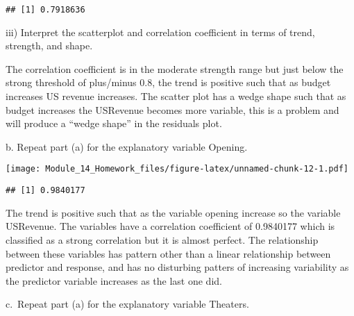 \documentclass[
]{article}
\newenvironment{Shaded}{\begin{snugshade}}{\end{snugshade}}
\newcommand{\AttributeTok}[1]{\textcolor[rgb]{0.13,0.29,0.53}{#1}}
\newcommand{\FunctionTok}[1]{\textcolor[rgb]{0.13,0.29,0.53}{\textbf{#1}}}
\newcommand{\NormalTok}[1]{#1}
\newcommand{\SpecialCharTok}[1]{\textcolor[rgb]{0.81,0.36,0.00}{\textbf{#1}}}
\begin{document}
\begin{verbatim}
## [1] 0.7918636
\end{verbatim}

\hfill\break
iii) Interpret the scatterplot and correlation coefficient in terms of
trend, strength, and shape.

The correlation coefficient is in the moderate strength range but just
below the strong threshold of plus/minus 0.8, the trend is positive such
that as budget increases US revenue increases. The scatter plot has a
wedge shape such that as budget increases the USRevenue becomes more
variable, this is a problem and will produce a ``wedge shape'' in the
residuals plot.

\hfill\break
b. Repeat part (a) for the explanatory variable Opening.

\begin{Shaded}
\end{Shaded}

\texttt{[image: Module\_14\_Homework\_files/figure-latex/unnamed-chunk-12-1.pdf]}

\begin{Shaded}
\end{Shaded}

\begin{verbatim}
## [1] 0.9840177
\end{verbatim}

The trend is positive such that as the variable opening increase so the
variable USRevenue. The variables have a correlation coefficient of
0.9840177 which is classified as a strong correlation but it is almost
perfect. The relationship between these variables has pattern other than
a linear relationship between predictor and response, and has no
disturbing patters of increasing variability as the predictor variable
increases as the last one did.

\hfill\break
c.~Repeat part (a) for the explanatory variable Theaters.
\end{document}
